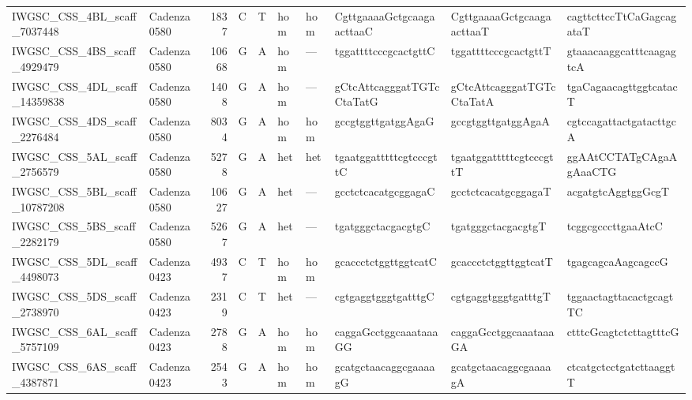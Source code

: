 \begin{tabular}{llrlllllll}
 IWGSC\_CSS\_4BL\_scaff\_7037448  & Cadenza0580 &       1837 & C         & T        & hom            & hom         & CgttgaaaaGctgcaagaacttaaC & CgttgaaaaGctgcaagaacttaaT & cagttcttccTtCaGagcagataT  \\
 IWGSC\_CSS\_4BS\_scaff\_4929479  & Cadenza0580 &      10668 & G         & A        & hom            & ---         & tggattttcccgcactgttC      & tggattttcccgcactgttT      & gtaaacaaggcatttcaagagtcA  \\
 IWGSC\_CSS\_4DL\_scaff\_14359838 & Cadenza0580 &       1408 & G         & A        & hom            & ---         & gCtcAttcagggatTGTcCtaTatG & gCtcAttcagggatTGTcCtaTatA & tgaCagaacagttggtcatacT    \\
 IWGSC\_CSS\_4DS\_scaff\_2276484  & Cadenza0580 &       8034 & G         & A        & hom            & hom         & gccgtggttgatggAgaG        & gccgtggttgatggAgaA        & cgtccagattactgatacttgcA   \\
 IWGSC\_CSS\_5AL\_scaff\_2756579  & Cadenza0580 &       5278 & G         & A        & het            & het         & tgaatggatttttcgtcccgttC   & tgaatggatttttcgtcccgttT   & ggAAtCCTATgCAgaAgAaaCTG   \\
 IWGSC\_CSS\_5BL\_scaff\_10787208 & Cadenza0580 &      10627 & G         & A        & het            & ---         & gcctctcacatgcggagaC       & gcctctcacatgcggagaT       & acgatgtcAggtggGcgT        \\
 IWGSC\_CSS\_5BS\_scaff\_2282179  & Cadenza0580 &       5267 & G         & A        & het            & ---         & tgatgggctacgacgtgC        & tgatgggctacgacgtgT        & tcggcgcccttgaaAtcC        \\
 IWGSC\_CSS\_5DL\_scaff\_4498073  & Cadenza0423 &       4937 & C         & T        & hom            & hom         & gcaccctctggttggtcatC      & gcaccctctggttggtcatT      & tgagcagcaAagcagccG        \\
 IWGSC\_CSS\_5DS\_scaff\_2738970  & Cadenza0423 &       2319 & C         & T        & het            & ---         & cgtgaggtgggtgatttgC       & cgtgaggtgggtgatttgT       & tggaactagttacactgcagtTC   \\
 IWGSC\_CSS\_6AL\_scaff\_5757109  & Cadenza0423 &       2788 & G         & A        & hom            & hom         & caggaGcctggcaaataaaGG     & caggaGcctggcaaataaaGA     & ctttcGcagtctcttagtttcG    \\
 IWGSC\_CSS\_6AS\_scaff\_4387871  & Cadenza0423 &       2543 & G         & A        & hom            & hom         & gcatgctaacaggcgaaaagG     & gcatgctaacaggcgaaaagA     & ctcatgctcctgatcttaaggtT   \\

\end{tabular}
